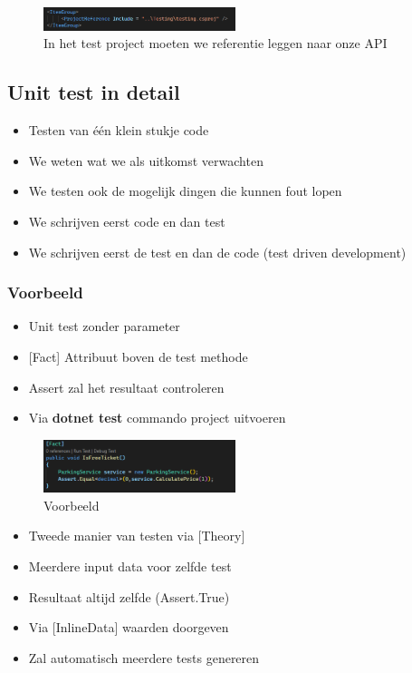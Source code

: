 \documentclass{article}
\begin{document}
\begin{figure}[H]
    \centering
    \includegraphics[width=0.5\textwidth]{xunit.png}
    \caption{In het test project moeten we referentie leggen naar onze API}
\end{figure}

\subsection{Unit test in detail}

\begin{itemize}
    \item Testen van één klein stukje code
    \item We weten wat we als uitkomst verwachten
    \item We testen ook de mogelijk dingen die kunnen fout lopen
    \item We schrijven eerst code en dan test
    \item We schrijven eerst de test en dan de code (test driven development)
\end{itemize}

\subsubsection{Voorbeeld}

\begin{itemize}
    \item Unit test zonder parameter
    \item {[Fact]} Attribuut boven de test methode
    \item Assert zal het resultaat controleren
    \item Via \textbf{dotnet test} commando project uitvoeren
\end{itemize}

\begin{figure}[H]
    \centering
    \includegraphics[width=0.5\textwidth]{unit-test1.png}
    \caption{Voorbeeld}
\end{figure}

\begin{itemize}
    \item Tweede manier van testen via {[Theory]}
    \item Meerdere input data voor zelfde test
    \item Resultaat altijd zelfde (Assert.True)
    \item Via {[InlineData]} waarden doorgeven
    \item Zal automatisch meerdere tests genereren
\end{itemize}
\end{document}
